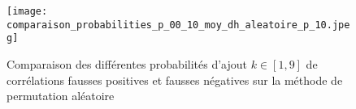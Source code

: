 \begin{figure}[htb!] 
\centering
\texttt{[image: comparaison\_probabilities\_p\_00\_10\_moy\_dh\_aleatoire\_p\_10.jpeg]}
\caption{ Comparaison des diff\'erentes probabilit\'es d'ajout $k \in [1,9]$ de corr\'elations fausses positives et fausses n\'egatives sur la m\'ethode de permutation al\'eatoire }
\label{compareDifferentesProbabilitesP0_1_fct_cout_unitaire_p05} 
\end{figure}

